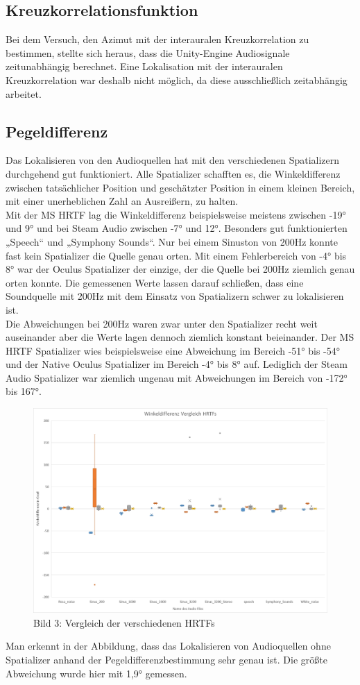 \documentclass[12pt,a4paper]{article}
\begin{document}
\subsection{Kreuzkorrelationsfunktion}
Bei dem Versuch, den Azimut mit der interauralen Kreuzkorrelation zu bestimmen, stellte sich heraus, dass die Unity-Engine Audiosignale zeitunabhängig berechnet. Eine Lokalisation mit der interauralen Kreuzkorrelation war deshalb nicht möglich, da diese ausschließlich zeitabhängig arbeitet.

\subsection{Pegeldifferenz}
Das Lokalisieren von den Audioquellen hat mit den verschiedenen Spatializern durchgehend gut funktioniert. Alle Spatializer schafften es, die Winkeldifferenz zwischen tatsächlicher Position und geschätzter Position in einem kleinen Bereich, mit einer unerheblichen Zahl an Ausreißern, zu halten.\\

Mit der MS HRTF lag die Winkeldifferenz beispielsweise meistens zwischen -19° und 9° und bei Steam Audio zwischen -7° und 12°. Besonders gut funktionierten „Speech“ und „Symphony Sounds“. Nur bei einem Sinuston von 200Hz konnte fast kein  Spatializer die Quelle genau orten. Mit einem Fehlerbereich von -4° bis 8° war der Oculus Spatializer der einzige, der die Quelle bei 200Hz ziemlich genau orten konnte. Die gemessenen Werte lassen darauf schließen, dass eine Soundquelle mit 200Hz mit dem Einsatz von Spatializern schwer zu lokalisieren ist.\\

Die Abweichungen bei 200Hz waren zwar unter den Spatializer recht weit auseinander aber die Werte lagen dennoch ziemlich konstant beieinander. Der MS HRTF Spatializer wies beispielsweise eine Abweichung im Bereich -51° bis -54° und der Native Oculus Spatializer im Bereich -4° bis 8° auf. Lediglich der Steam Audio Spatializer war ziemlich ungenau mit Abweichungen im Bereich von -172° bis 167°.\\

\begin{figure}[h!]
\centering
\includegraphics[scale=0.4]{Vergleich_HRTFs}
\caption{Bild 3: Vergleich der verschiedenen HRTFs}
\end{figure}

Man erkennt in der Abbildung, dass das Lokalisieren von Audioquellen ohne Spatializer anhand der Pegeldifferenzbestimmung sehr genau ist. Die größte Abweichung wurde hier mit 1,9° gemessen.





\end{document}
